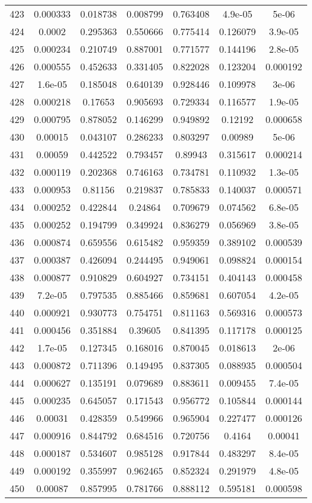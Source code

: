 \begin{table}
\begin{tabular}{c|c|c|c|c|c|c}
423 & 0.000333 & 0.018738 & 0.008799 & 0.763408 & 4.9e-05 & 5e-06\\
424 & 0.0002 & 0.295363 & 0.550666 & 0.775414 & 0.126079 & 3.9e-05\\
425 & 0.000234 & 0.210749 & 0.887001 & 0.771577 & 0.144196 & 2.8e-05\\
426 & 0.000555 & 0.452633 & 0.331405 & 0.822028 & 0.123204 & 0.000192\\
427 & 1.6e-05 & 0.185048 & 0.640139 & 0.928446 & 0.109978 & 3e-06\\
428 & 0.000218 & 0.17653 & 0.905693 & 0.729334 & 0.116577 & 1.9e-05\\
429 & 0.000795 & 0.878052 & 0.146299 & 0.949892 & 0.12192 & 0.000658\\
430 & 0.00015 & 0.043107 & 0.286233 & 0.803297 & 0.00989 & 5e-06\\
431 & 0.00059 & 0.442522 & 0.793457 & 0.89943 & 0.315617 & 0.000214\\
432 & 0.000119 & 0.202368 & 0.746163 & 0.734781 & 0.110932 & 1.3e-05\\
433 & 0.000953 & 0.81156 & 0.219837 & 0.785833 & 0.140037 & 0.000571\\
434 & 0.000252 & 0.422844 & 0.24864 & 0.709679 & 0.074562 & 6.8e-05\\
435 & 0.000252 & 0.194799 & 0.349924 & 0.836279 & 0.056969 & 3.8e-05\\
436 & 0.000874 & 0.659556 & 0.615482 & 0.959359 & 0.389102 & 0.000539\\
437 & 0.000387 & 0.426094 & 0.244495 & 0.949061 & 0.098824 & 0.000154\\
438 & 0.000877 & 0.910829 & 0.604927 & 0.734151 & 0.404143 & 0.000458\\
439 & 7.2e-05 & 0.797535 & 0.885466 & 0.859681 & 0.607054 & 4.2e-05\\
440 & 0.000921 & 0.930773 & 0.754751 & 0.811163 & 0.569316 & 0.000573\\
441 & 0.000456 & 0.351884 & 0.39605 & 0.841395 & 0.117178 & 0.000125\\
442 & 1.7e-05 & 0.127345 & 0.168016 & 0.870045 & 0.018613 & 2e-06\\
443 & 0.000872 & 0.711396 & 0.149495 & 0.837305 & 0.088935 & 0.000504\\
444 & 0.000627 & 0.135191 & 0.079689 & 0.883611 & 0.009455 & 7.4e-05\\
445 & 0.000235 & 0.645057 & 0.171543 & 0.956772 & 0.105844 & 0.000144\\
446 & 0.00031 & 0.428359 & 0.549966 & 0.965904 & 0.227477 & 0.000126\\
447 & 0.000916 & 0.844792 & 0.684516 & 0.720756 & 0.4164 & 0.00041\\
448 & 0.000187 & 0.534607 & 0.985128 & 0.917844 & 0.483297 & 8.4e-05\\
449 & 0.000192 & 0.355997 & 0.962465 & 0.852324 & 0.291979 & 4.8e-05\\
450 & 0.00087 & 0.857995 & 0.781766 & 0.888112 & 0.595181 & 0.000598\\
\end{tabular}
\end{table}
